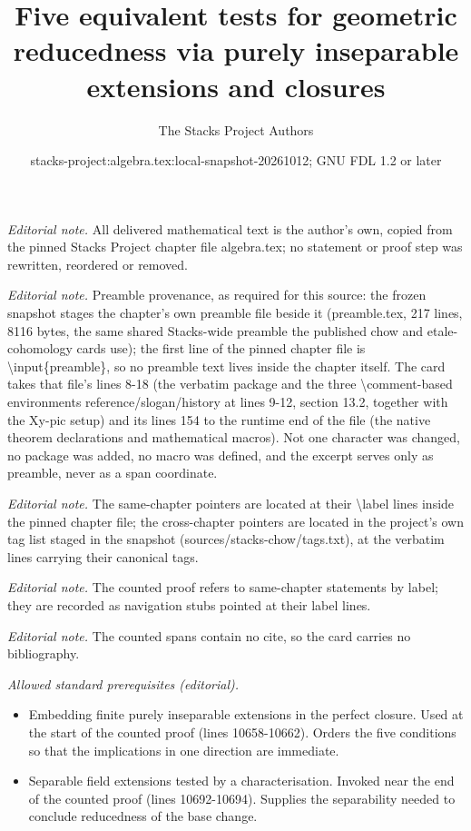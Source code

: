 \documentclass[10pt,a4paper]{amsart}
\title{Five equivalent tests for geometric reducedness via purely inseparable extensions and closures}
\author{The Stacks Project Authors}
\date{stacks-project:algebra.tex:local-snapshot-20261012; GNU FDL 1.2 or later}
\theoremstyle{plain}
\theoremstyle{definition}
\theoremstyle{remark}
\numberwithin{equation}{subsection}
\begin{document}
\maketitle
\noindent\textit{Editorial note.} All delivered mathematical text is the author's own, copied from the pinned Stacks Project chapter file algebra.tex; no statement or proof step was rewritten, reordered or removed.\par\medskip
\noindent\textit{Editorial note.} Preamble provenance, as required for this source: the frozen snapshot stages the chapter's own preamble file beside it (preamble.tex, 217 lines, 8116 bytes, the same shared Stacks-wide preamble the published chow and etale-cohomology cards use); the first line of the pinned chapter file is \textbackslash{}input\{preamble\}, so no preamble text lives inside the chapter itself. The card takes that file's lines 8-18 (the verbatim package and the three \textbackslash{}comment-based environments reference/slogan/history at lines 9-12, section 13.2, together with the Xy-pic setup) and its lines 154 to the runtime end of the file (the native theorem declarations and mathematical macros). Not one character was changed, no package was added, no macro was defined, and the excerpt serves only as preamble, never as a span coordinate.\par\medskip
\noindent\textit{Editorial note.} The same-chapter pointers are located at their \textbackslash{}label lines inside the pinned chapter file; the cross-chapter pointers are located in the project's own tag list staged in the snapshot (sources/stacks-chow/tags.txt), at the verbatim lines carrying their canonical tags.\par\medskip
\noindent\textit{Editorial note.} The counted proof refers to same-chapter statements by label; they are recorded as navigation stubs pointed at their label lines.\par\medskip
\noindent\textit{Editorial note.} The counted spans contain no cite, so the card carries no bibliography.\par\medskip
\noindent\textit{Allowed standard prerequisites (editorial).}\begin{itemize}
\item Embedding finite purely inseparable extensions in the perfect closure. Used at the start of the counted proof (lines 10658-10662). Orders the five conditions so that the implications in one direction are immediate.
\item Separable field extensions tested by a characterisation. Invoked near the end of the counted proof (lines 10692-10694). Supplies the separability needed to conclude reducedness of the base change.
\end{itemize}\medskip
\end{document}
